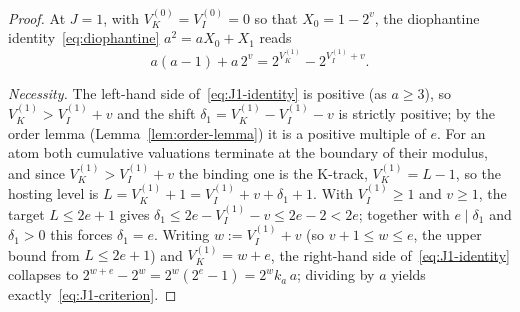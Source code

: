 \documentclass[11pt,reqno]{amsart}
\theoremstyle{plain}
\theoremstyle{definition}
\theoremstyle{remark}
\newcommand{\Vk}{V_{K}}
\newcommand{\Vi}{V_{I}}
\begin{document}
\begin{proof}
At $J = 1$, with $\Vk^{(0)} = \Vi^{(0)} = 0$ so that $X_0 = 1 - 2^v$, the
diophantine identity~\eqref{eq:diophantine} $a^2 = a X_0 + X_1$ reads
\begin{equation}\label{eq:J1-identity}
a(a - 1) + a\,2^v = 2^{\Vk^{(1)}} - 2^{\Vi^{(1)} + v}.
\end{equation}

\emph{Necessity.} The left-hand side of~\eqref{eq:J1-identity} is positive
(as $a \ge 3$), so $\Vk^{(1)} > \Vi^{(1)} + v$ and the shift
$\delta_1 = \Vk^{(1)} - \Vi^{(1)} - v$ is strictly positive; by the order
lemma (Lemma~\ref{lem:order-lemma}) it is a positive multiple of $e$. For
an atom both cumulative valuations terminate at the boundary of their
modulus, and since $\Vk^{(1)} > \Vi^{(1)} + v$ the binding one is the
K-track, $\Vk^{(1)} = L - 1$, so the hosting level is
$L = \Vk^{(1)} + 1 = \Vi^{(1)} + v + \delta_1 + 1$. With $\Vi^{(1)} \ge 1$
and $v \ge 1$, the target $L \le 2e + 1$ gives
$\delta_1 \le 2e - \Vi^{(1)} - v \le 2e - 2 < 2e$; together with
$e \mid \delta_1$ and $\delta_1 > 0$ this forces $\delta_1 = e$. Writing
$w := \Vi^{(1)} + v$ (so $v + 1 \le w \le e$, the upper bound from
$L \le 2e + 1$) and $\Vk^{(1)} = w + e$, the right-hand side
of~\eqref{eq:J1-identity} collapses to
$2^{w + e} - 2^{w} = 2^{w}(2^e - 1) = 2^{w} k_a\,a$; dividing by $a$ yields
exactly~\eqref{eq:J1-criterion}.


\end{proof}
\end{document}
